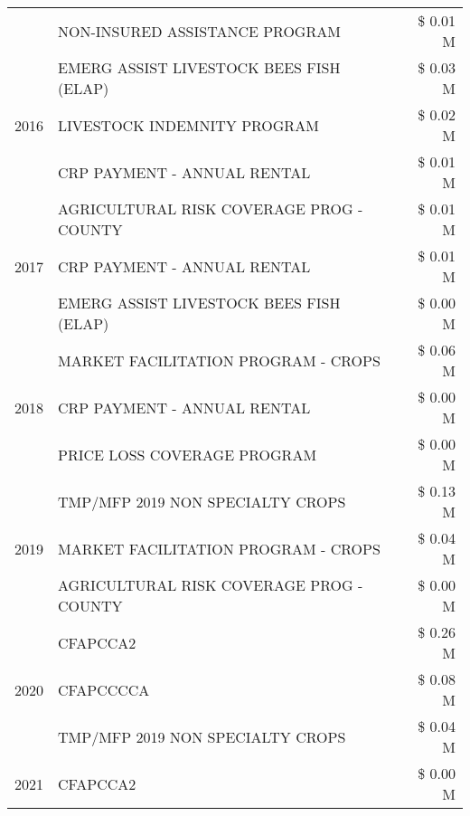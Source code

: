 \begin{tabular}{llr}
 & NON-INSURED ASSISTANCE PROGRAM & \$ 0.01 M \\
\cline{1-3}
\multirow[t]{3}{*}{2016} & EMERG ASSIST LIVESTOCK BEES FISH (ELAP) & \$ 0.03 M \\
 & LIVESTOCK INDEMNITY PROGRAM & \$ 0.02 M \\
 & CRP PAYMENT - ANNUAL RENTAL & \$ 0.01 M \\
\cline{1-3}
\multirow[t]{3}{*}{2017} & AGRICULTURAL RISK COVERAGE PROG - COUNTY & \$ 0.01 M \\
 & CRP PAYMENT - ANNUAL RENTAL & \$ 0.01 M \\
 & EMERG ASSIST LIVESTOCK BEES FISH (ELAP) & \$ 0.00 M \\
\cline{1-3}
\multirow[t]{3}{*}{2018} & MARKET FACILITATION PROGRAM - CROPS & \$ 0.06 M \\
 & CRP PAYMENT - ANNUAL RENTAL & \$ 0.00 M \\
 & PRICE LOSS COVERAGE PROGRAM & \$ 0.00 M \\
\cline{1-3}
\multirow[t]{3}{*}{2019} & TMP/MFP 2019 NON SPECIALTY CROPS & \$ 0.13 M \\
 & MARKET FACILITATION PROGRAM - CROPS & \$ 0.04 M \\
 & AGRICULTURAL RISK COVERAGE PROG - COUNTY & \$ 0.00 M \\
\cline{1-3}
\multirow[t]{3}{*}{2020} & CFAPCCA2 & \$ 0.26 M \\
 & CFAPCCCCA & \$ 0.08 M \\
 & TMP/MFP 2019 NON SPECIALTY CROPS & \$ 0.04 M \\
\cline{1-3}
2021 & CFAPCCA2 & \$ 0.00 M \\
\cline{1-3}
\bottomrule
\end{tabular}
